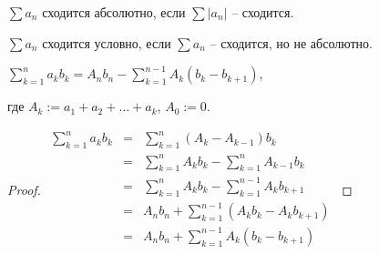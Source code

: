 
\begin{definition} \thmslashn 

    $\sum a_n$ сходится абсолютно, если $\sum |a_n|$ -- сходится.
    
    $\sum a_n$ сходится условно, если $\sum a_n$ -- сходится, но не абсолютно.
    
\end{definition}

\begin{theorem} \thmslashn 

	$\sum\limits_{k=1}^{n} a_kb_k = A_nb_n - \sum\limits_{k=1}^{n-1} A_k(b_k - b_{k+1})$,
	
	где $A_k := a_1 + a_2 + \dotsc + a_k$, $A_0 := 0$.
	
	\begin{proof} \thmslashn
    
        $\begin{array}{rcll}
    	\sum\limits_{k=1}^{n} a_kb_k &=& \sum\limits_{k=1}^{n} (A_k - A_{k-1})b_k \\
    	                             &=& \sum\limits_{k=1}^{n} A_kb_k - \sum\limits_{k=1}^{n} A_{k-1}b_k \\
    	                             &=& \sum\limits_{k=1}^{n} A_kb_k - \sum\limits_{k=1}^{n-1} A_kb_{k+1} \\
    	                             &=& A_nb_n + \sum\limits_{k=1}^{n-1} (A_kb_k - A_kb_{k+1}) \\
    	                             &=& A_nb_n + \sum\limits_{k=1}^{n-1} A_k(b_k - b_{k+1}) \\
    	\end{array}$

    \end{proof}

\end{theorem}

